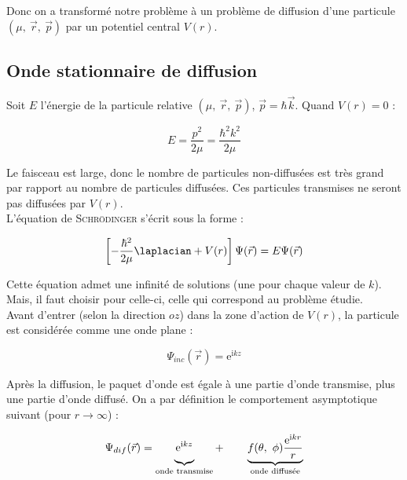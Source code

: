\documentclass[12pt,a4paper,oneside,french]{book}
\renewcommand{\i}{\mathrm{i}}
\newcommand{\e}{\mathrm{e}}
\theoremstyle{definition}
\theoremstyle{definition}
\theoremstyle{definition}
\theoremstyle{remark}
\theoremstyle{definition}
\begin{document}
    Donc on a transformé notre problème à un problème de diffusion d'une particule $(\mu, \ \vec{r}, \ \vec{p})$ par un potentiel central $V(r)$.
    
    \subsection{Onde stationnaire de diffusion}
    Soit $E$ l'énergie de la particule relative $(\mu, \ \vec{r}, \ \vec{p})$, $\vec{p} = \hbar \vec{k}$. Quand $V(r) = 0$ :
    
    \begin{equation*}
        E = \frac{{p}^{2}}{2 \mu} = \frac{{\hbar}^{2} {k}^{2}}{2 \mu}
    \end{equation*}
    
    Le faisceau est large, donc le nombre de particules non-diffusées est très grand par rapport au nombre de particules diffusées. Ces particules transmises ne seront pas diffusées par $V(r)$. \\
    
    L'équation de \textsc{Schrödinger} s'écrit sous la forme :
    
    \begin{equation*}
        \left[-\frac{{\hbar}^{2}}{2 \mu} \laplacian + V(r)\right] \Psi(\vec{r}) = E \Psi(\vec{r})
    \end{equation*}
    
    Cette équation admet une infinité de solutions (une pour chaque valeur de $k$). Mais, il faut choisir pour celle-ci, celle qui correspond au problème étudie. \\
    
    Avant d'entrer (selon la direction $oz$) dans la zone d'action de $V(r)$, la particule est considérée comme une onde plane :
    
    \begin{equation*}
        {\Psi}_{inc}(\vec{r}) = {\e}^{\i k z}
    \end{equation*}
    
    Après la diffusion, le paquet d'onde est égale à une partie d'onde transmise, plus une partie d'onde diffusé. On a par définition le comportement asymptotique suivant (pour $r \to \infty$) :
    
    \begin{equation*}
        {\Psi}_{dif}(\vec{r}) = \underbrace{{\e}^{\i k z} \vphantom{f(\theta, \ \phi) \frac{{\e}^{\i k r}}{r}}}_{\text{onde transmise}} + \qquad \underbrace{f(\theta, \ \phi) \frac{{\e}^{\i k r}}{r}}_{\text{onde diffusée}}
    \end{equation*}
    
\end{document}
